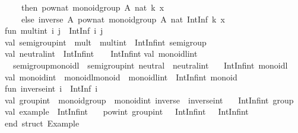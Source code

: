 \begin{isabellebody}
\begin{isamarkuptext}
\begin{typewriter}
\ \ \ \ then\ pow{\isacharunderscore}nat\ {\isacharparenleft}monoid{\isacharunderscore}group\ A{\isacharunderscore}{\isacharparenright}\ {\isacharparenleft}nat\ k{\isacharparenright}\ x\isanewline
\ \ \ \ else\ inverse\ A{\isacharunderscore}\ {\isacharparenleft}pow{\isacharunderscore}nat\ {\isacharparenleft}monoid{\isacharunderscore}group\ A{\isacharunderscore}{\isacharparenright}\ {\isacharparenleft}nat\ {\isacharparenleft}IntInf{\isachardot}{\isachartilde}\ k{\isacharparenright}{\isacharparenright}\ x{\isacharparenright}{\isacharparenright}{\isacharsemicolon}\isanewline
\isanewline
fun\ mult{\isacharunderscore}int\ i\ j\ {\isacharequal}\ IntInf{\isachardot}{\isacharplus}\ {\isacharparenleft}i{\isacharcomma}\ j{\isacharparenright}{\isacharsemicolon}\isanewline
\isanewline
val\ semigroup{\isacharunderscore}int\ {\isacharequal}\ {\isacharbraceleft}mult\ {\isacharequal}\ mult{\isacharunderscore}int{\isacharbraceright}\ {\isacharcolon}\ IntInf{\isachardot}int\ semigroup{\isacharsemicolon}\isanewline
\isanewline
val\ neutral{\isacharunderscore}int\ {\isacharcolon}\ IntInf{\isachardot}int\ {\isacharequal}\ {\isacharparenleft}{}\ {\isacharcolon}\ IntInf{\isachardot}int{\isacharparenright}{\isacharsemicolon}\isanewline
\isanewline
val\ monoidl{\isacharunderscore}int\ {\isacharequal}\isanewline
\ \ {\isacharbraceleft}semigroup{\isacharunderscore}monoidl\ {\isacharequal}\ semigroup{\isacharunderscore}int{\isacharcomma}\ neutral\ {\isacharequal}\ neutral{\isacharunderscore}int{\isacharbraceright}\ {\isacharcolon}\isanewline
\ \ IntInf{\isachardot}int\ monoidl{\isacharsemicolon}\isanewline
\isanewline
val\ monoid{\isacharunderscore}int\ {\isacharequal}\ {\isacharbraceleft}monoidl{\isacharunderscore}monoid\ {\isacharequal}\ monoidl{\isacharunderscore}int{\isacharbraceright}\ {\isacharcolon}\ IntInf{\isachardot}int\ monoid{\isacharsemicolon}\isanewline
\isanewline
fun\ inverse{\isacharunderscore}int\ i\ {\isacharequal}\ IntInf{\isachardot}{\isachartilde}\ i{\isacharsemicolon}\isanewline
\isanewline
val\ group{\isacharunderscore}int\ {\isacharequal}\ {\isacharbraceleft}monoid{\isacharunderscore}group\ {\isacharequal}\ monoid{\isacharunderscore}int{\isacharcomma}\ inverse\ {\isacharequal}\ inverse{\isacharunderscore}int{\isacharbraceright}\ {\isacharcolon}\isanewline
\ \ IntInf{\isachardot}int\ group{\isacharsemicolon}\isanewline
\isanewline
val\ example\ {\isacharcolon}\ IntInf{\isachardot}int\ {\isacharequal}\isanewline
\ \ pow{\isacharunderscore}int\ group{\isacharunderscore}int\ {\isacharparenleft}{}{}\ {\isacharcolon}\ IntInf{\isachardot}int{\isacharparenright}\ {\isacharparenleft}{\isachartilde}{}\ {\isacharcolon}\ IntInf{\isachardot}int{\isacharparenright}{\isacharsemicolon}\isanewline
\isanewline
end{\isacharsemicolon}\ {\isacharparenleft}{\isacharasterisk}struct\ Example{\isacharasterisk}{\isacharparenright}\isanewline


\end{typewriter}
\end{isamarkuptext}
\end{isabellebody}
